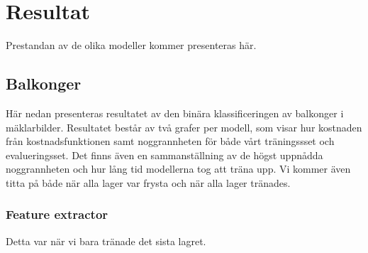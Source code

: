 \documentclass{kththesis}
\begin{document}
\chapter{Resultat}
Prestandan av de olika modeller kommer presenteras här.

  \section{Balkonger}
  Här nedan presenteras resultatet av den binära klassificeringen av balkonger i mäklarbilder.
  Resultatet består av två grafer per modell, som visar hur kostnaden från kostnadsfunktionen samt noggrannheten för både vårt träningssset och evalueringsset.
  Det finns även en sammanställning av de högst uppnådda noggrannheten och hur lång tid modellerna tog att träna upp.
  Vi kommer även titta på både när alla lager var frysta och när alla lager tränades.

    \subsection{Feature extractor}
    Detta var när vi bara tränade det sista lagret.
\end{document}
